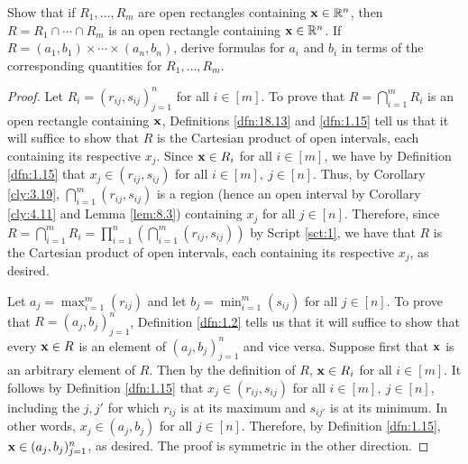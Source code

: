\documentclass[../main.tex]{subfiles}
\begin{document}
\begin{exercise}\label{exr:18.16}
    Show that if $R_1,\dots,R_m$ are open rectangles containing $\mathbf{x}\in\mathbb{R}^n$, then $R=R_1\cap\cdots\cap R_m$ is an open rectangle containing $\mathbf{x}\in\mathbb{R}^n$. If $R=(a_1,b_1)\times\cdots\times(a_n,b_n)$, derive formulas for $a_i$ and $b_i$ in terms of the corresponding quantities for $R_1,\dots,R_m$.
    \begin{proof}
        Let $R_i=(r_{ij},s_{ij})_{j=1}^n$ for all $i\in[m]$. To prove that $R=\bigcap_{i=1}^mR_i$ is an open rectangle containing $\mathbf{x}$, Definitions \ref{dfn:18.13} and \ref{dfn:1.15} tell us that it will suffice to show that $R$ is the Cartesian product of open intervals, each containing its respective $x_j$. Since $\mathbf{x}\in R_i$ for all $i\in[m]$, we have by Definition \ref{dfn:1.15} that $x_j\in(r_{ij},s_{ij})$ for all $i\in[m],\ j\in[n]$. Thus, by Corollary \ref{cly:3.19}, $\bigcap_{i=1}^m(r_{ij},s_{ij})$ is a region (hence an open interval by Corollary \ref{cly:4.11} and Lemma \ref{lem:8.3}) containing $x_j$ for all $j\in[n]$. Therefore, since $R=\bigcap_{i=1}^mR_i=\prod_{i=1}^n(\bigcap_{i=1}^m(r_{ij},s_{ij}))$ by Script \ref{sct:1}, we have that $R$ is the Cartesian product of open intervals, each containing its respective $x_j$, as desired.\par
        Let $a_j=\max_{i=1}^m(r_{ij})$ and let $b_j=\min_{i=1}^m(s_{ij})$ for all $j\in[n]$. To prove that $R=(a_j,b_j)_{j=1}^n$, Definition \ref{dfn:1.2} tells us that it will suffice to show that every $\mathbf{x}\in R$ is an element of $(a_j,b_j)_{j=1}^n$ and vice versa. Suppose first that $\mathbf{x}$ is an arbitrary element of $R$. Then by the definition of $R$, $\mathbf{x}\in R_i$ for all $i\in[m]$. It follows by Definition \ref{dfn:1.15} that $x_j\in(r_{ij},s_{ij})$ for all $i\in[m],\ j\in[n]$, including the $j,j'$ for which $r_{ij}$ is at its maximum and $s_{ij'}$ is at its minimum. In other words, $x_j\in(a_j,b_j)$ for all $j\in[n]$. Therefore, by Definition \ref{dfn:1.15}, $\mathbf{x}\in(a_j,b_j)_{j=1}^n$, as desired. The proof is symmetric in the other direction.
    \end{proof}
\end{exercise}
\end{document}
